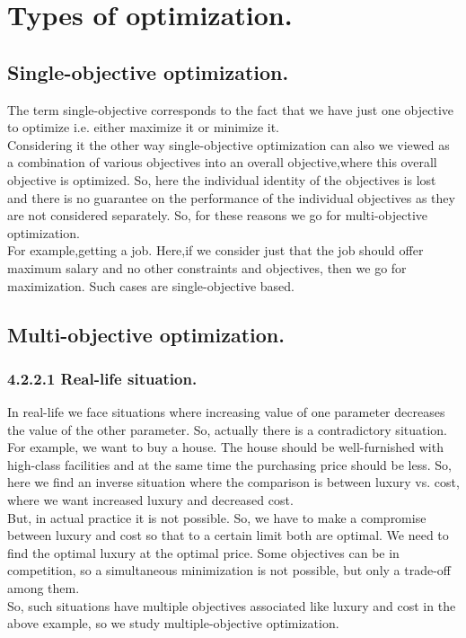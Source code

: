 \section{Types of optimization.}
\subsection{Single-objective optimization.}The term single-objective corresponds to the fact that we have just one objective to optimize i.e. either maximize it or minimize it.\\Considering it the other way single-objective optimization can also we viewed as a combination of various objectives into an overall objective,where this overall objective is optimized. So, here the individual identity of the objectives is lost and there is no guarantee on the performance of the individual objectives as they are not considered separately. So, for these reasons we go for multi-objective optimization.\\For example,getting a job. Here,if we consider just that the job should offer maximum salary and no other constraints and objectives, then we go for maximization. Such cases are single-objective based.
\subsection{Multi-objective optimization.}
\subsubsection{4.2.2.1 Real-life situation.}In real-life we face situations where increasing value of one parameter decreases the value of the other parameter. So, actually there is a contradictory situation. For example, we want to buy a house. The house should be well-furnished with high-class facilities and at the same time the purchasing price should be less. So, here we find an inverse situation where the comparison is between luxury vs. cost, where we want increased luxury and decreased cost.\\
But, in actual practice it is not possible. So, we have to make a compromise between luxury and cost so that to a certain limit both are optimal. We need to find the optimal luxury at the optimal price. Some objectives can be in competition, so a simultaneous minimization is not possible, but only a trade-off among them.\\
So, such situations have multiple objectives associated like luxury and cost in the above example, so we study multiple-objective optimization.
